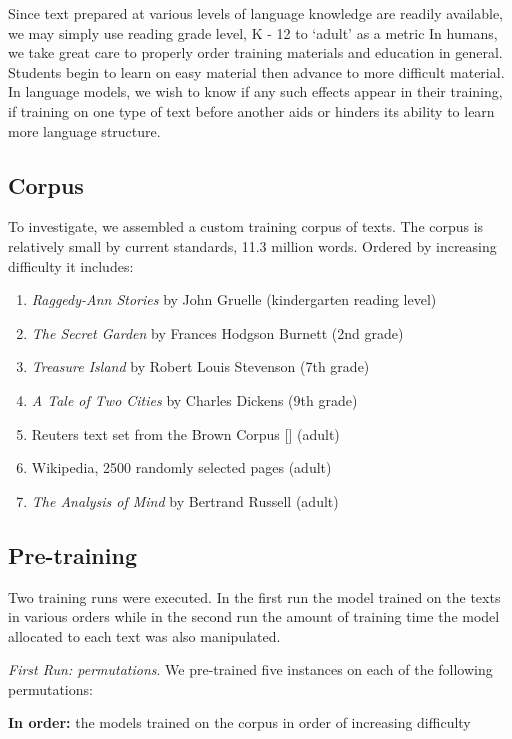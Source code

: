 \documentclass{article}
\begin{document}
Since text prepared at various levels of language knowledge are readily available, we may simply use reading grade level, K - 12 to `adult' as a metric 
In humans, we take great care to properly order training materials and education in general. Students begin to learn on easy material then advance to more difficult material. In language models, we wish to know if any such effects appear in their training, if training on one type of text before another aids or hinders its ability to learn more language structure.


\subsection{Corpus}
To investigate, we assembled a custom training corpus of texts. The corpus is relatively small by current standards, 11.3 million words. Ordered by increasing difficulty it includes:
\begin{enumerate}
	\item \emph{Raggedy-Ann Stories} by John Gruelle (kindergarten reading level)
	\item \emph{The Secret Garden} by Frances Hodgson Burnett (2nd grade)
	\item \emph{Treasure Island} by Robert Louis Stevenson (7th grade)
	\item \emph{A Tale of Two Cities} by Charles Dickens (9th grade)
	\item Reuters text set from the Brown Corpus [] (adult)
	\item Wikipedia, 2500 randomly selected pages (adult)
	\item \emph{The Analysis of Mind} by Bertrand Russell (adult)
\end{enumerate}

\subsection{Pre-training}

Two training runs were executed. In the first run the model trained on the texts in various orders while in the second run the amount of training time the model allocated to each text was also manipulated.

\emph{First Run: permutations}. We pre-trained five instances on each of the following permutations:

\textbf{In order:} the models trained on the corpus in order of increasing difficulty
\end{document}
